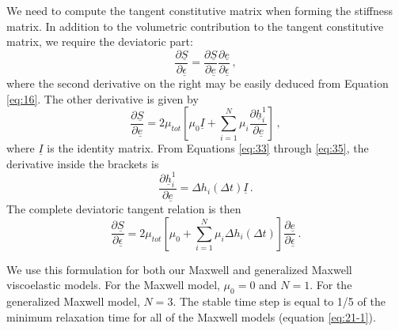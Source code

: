 We need to compute the tangent constitutive matrix when forming the
stiffness matrix. In addition to the volumetric contribution to the
tangent constitutive matrix, we require the deviatoric part:
\begin{equation}
\frac{\partial\underline{S}}{\partial\underline{\epsilon}}=\frac{\partial\underline{S}}{\partial\underline{e}}\frac{\partial\underline{e}}{\partial\underline{\epsilon}}\,,\label{eq:38}
\end{equation}
where the second derivative on the right may be easily deduced from
Equation \ref{eq:16}. The other derivative is given by
\begin{equation}
\frac{\partial\underline{S}}{\partial\underline{e}}=2\mu_{tot}\left[\mu_{0}\underline{I}+\sum_{i=1}^{N}\mu_{i}\frac{\partial\underline{h}_{i}^{1}}{\partial\underline{e}}\right]\,,\label{eq:39}
\end{equation}
where $\underline{I}$ is the identity matrix. From Equations \ref{eq:33}
through \ref{eq:35}, the derivative inside the brackets is
\begin{equation}
\frac{\partial\underline{h}_{i}^{1}}{\partial\underline{e}}=\Delta h_{i}\left(\Delta t\right)\underline{I}\,.\label{eq:40}
\end{equation}
The complete deviatoric tangent relation is then
\begin{equation}
\frac{\partial\underline{S}}{\partial\underline{\epsilon}}=2\mu_{tot}\left[\mu_{0}+\sum_{i=1}^{N}\mu_{i}\Delta h_{i}\left(\Delta t\right)\right]\frac{\partial\underline{e}}{\partial\underline{\epsilon}}\,.\label{eq:41}
\end{equation}


We use this formulation for both our Maxwell and generalized Maxwell
viscoelastic models. For the Maxwell model, $\mu_{0}=0$ and $N=1$.
For the generalized Maxwell model, $N=3.$ The stable time step is
equal to 1/5 of the minimum relaxation time for all of the Maxwell
models (equation \ref{eq:21-1}).


